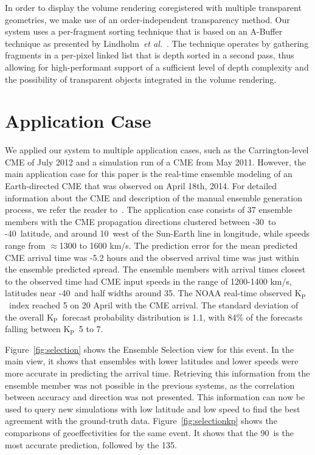\documentclass[journal]{vgtc}                %
\def\etal{\textit{et al.}}
\newcommand{\kpIndex}{$\textrm{K}_\textrm{P}$}
\begin{document}
In order to display the volume rendering coregistered with multiple transparent geometries, we make use of an order-independent transparency method. Our system uses a per-fragment sorting technique that is based on an A-Buffer technique as presented by Lindholm~\etal~\cite{Lindholm:2014fm}. The technique operates by gathering fragments in a per-pixel linked list that is depth sorted in a second pass, thus allowing for high-performant support of a sufficient level of depth complexity and the possibility of transparent objects integrated in the volume rendering. 

\section{Application Case} \label{sec:applicationcase}
We applied our system to multiple application cases, such as the Carrington-level CME of July 2012 and a simulation run of a CME from May 2011. However, the main application case for this paper is the real-time ensemble modeling of an Earth-directed CME that was observed on April 18th, 2014. For detailed information about the CME and description of the manual ensemble generation process, we refer the reader to~\cite{mays2015ensemble}. The application case consists of 37 ensemble members with the CME propagation directions clustered between -30\degree\ to -40\degree\ latitude, and around 10\degree\ west of the Sun-Earth line in longitude, while speeds range from $\approx$1300 to 1600 km/s. The prediction error for the mean predicted CME arrival time was -5.2 hours and the observed arrival time was just within the ensemble predicted spread. The ensemble members with arrival times closest to the observed time had CME input speeds in the range of 1200-1400 km/s, latitudes near -40\degree\ and half widths around 35\degree . The NOAA real-time observed \kpIndex\ index reached 5 on 20 April with the CME arrival. The standard deviation of the overall \kpIndex\ forecast probability distribution is 1.1, with 84\% of the forecasts falling between \kpIndex\ 5 to 7.

Figure~\ref{fig:selection} shows the Ensemble Selection view for this event. In the main view, it shows that ensembles with lower latitudes and lower speeds were more accurate in predicting the arrival time. Retrieving this information from the ensemble member was not possible in the previous systems, as the correlation between accuracy and direction was not presented. This information can now be used to query new simulations with low latitude and low speed to find the best agreement with the ground-truth data. Figure~\ref{fig:selectionkp} shows the comparisons of geoeffectivities for the same event. It shows that the 90\degree\ is the most accurate prediction, followed by the 135\degree . %
\end{document}
